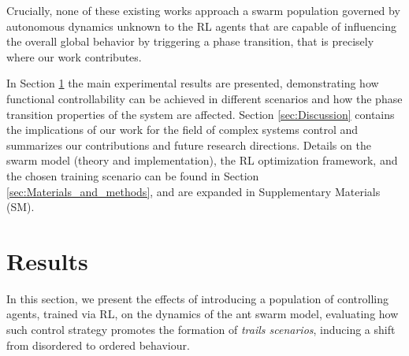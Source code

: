 \documentclass[openacc]{rsproca_new}
\begin{document}
Crucially, none of these existing works approach a swarm population governed by autonomous dynamics unknown to the RL agents that are capable of influencing the overall global behavior by triggering a phase transition, that is precisely where our work contributes.

In Section \ref{sec:Results} the main experimental results are presented, demonstrating how functional controllability can be achieved in different scenarios and how the phase transition properties of the system are affected. Section \ref{sec:Discussion} contains the implications of our work for the field of complex systems control and summarizes our contributions and future research directions. Details on the swarm model (theory and implementation), the RL optimization framework, and the chosen training scenario can be found in Section \ref{sec:Materials_and_methods}, and are expanded in Supplementary Materials (SM).

\section{Results}
\label{sec:Results}
In this section, we present the effects of introducing a population of controlling agents, trained via RL, on the dynamics of the ant swarm model, evaluating how such control strategy promotes the formation of \emph{trails scenarios}, inducing a shift from disordered to ordered behaviour.
\end{document}
